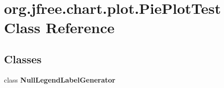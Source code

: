 \hypertarget{classorg_1_1jfree_1_1chart_1_1plot_1_1_pie_plot_test}{}\section{org.\+jfree.\+chart.\+plot.\+Pie\+Plot\+Test Class Reference}
\label{classorg_1_1jfree_1_1chart_1_1plot_1_1_pie_plot_test}
\subsection*{Classes}
\begin{DoxyCompactItemize}
\item 
class {\bfseries Null\+Legend\+Label\+Generator}
\end{DoxyCompactItemize}
